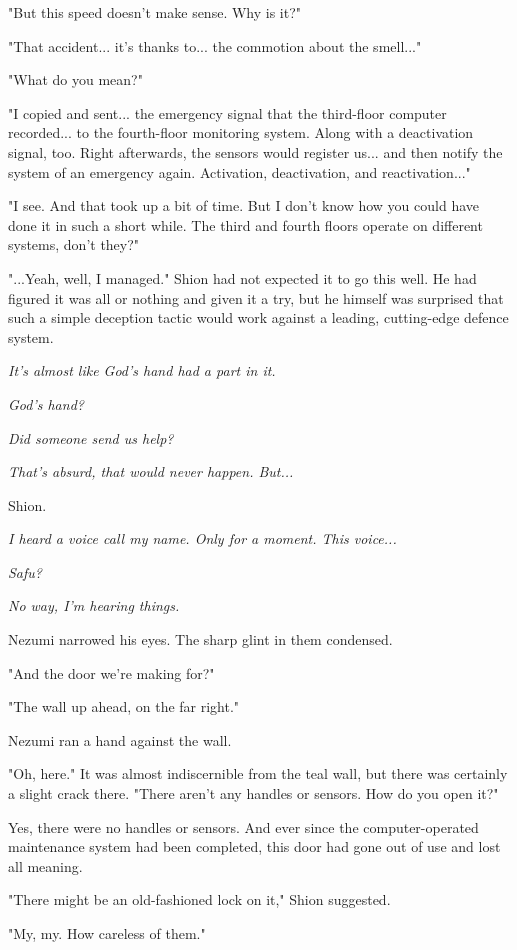 "But this speed doesn't make sense. Why is it?"

"That accident... it's thanks to... the commotion about the smell..."

"What do you mean?"

"I copied and sent... the emergency signal that the third-floor computer
recorded... to the fourth-floor monitoring system. Along with a
deactivation signal, too. Right afterwards, the sensors would register
us... and then notify the system of an emergency again. Activation,
deactivation, and reactivation..."

"I see. And that took up a bit of time. But I don't know how you could
have done it in such a short while. The third and fourth floors operate
on different systems, don't they?"

"...Yeah, well, I managed." Shion had not expected it to go this well.
He had figured it was all or nothing and given it a try, but he himself
was surprised that such a simple deception tactic would work against a
leading, cutting-edge defence system.

\emph{It's almost like God's hand had a part in it.}

\emph{God's hand?}

\emph{Did someone send us help?}

\emph{That's absurd, that would never happen. But...}

Shion.

\emph{I heard a voice call my name. Only for a moment. This voice...}

\emph{Safu?}

\emph{No way, I'm hearing things.}

Nezumi narrowed his eyes. The sharp glint in them condensed.

"And the door we're making for?"

"The wall up ahead, on the far right."

Nezumi ran a hand against the wall.

"Oh, here." It was almost indiscernible from the teal wall, but there
was certainly a slight crack there. "There aren't any handles or
sensors. How do you open it?"

Yes, there were no handles or sensors. And ever since the
computer-operated maintenance system had been completed, this door had
gone out of use and lost all meaning.

"There might be an old-fashioned lock on it," Shion suggested.

"My, my. How careless of them."

